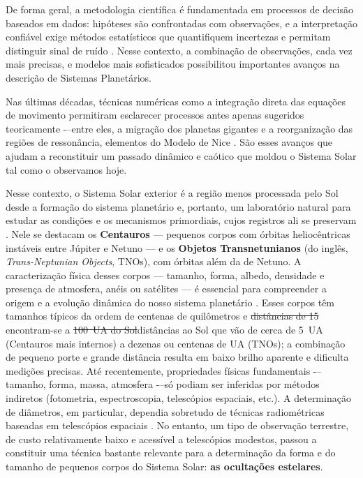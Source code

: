\documentclass[msc]{on} %
\makeatletter
\providecommand{\DIFaddtex}[1]{{\protect\color{red}#1}} %
\providecommand{\DIFdeltex}[1]{{\protect\color{red}\sout{#1}}} %
\providecommand{\DIFaddbegin}{} %
\providecommand{\DIFaddend}{} %
\providecommand{\DIFdelbegin}{} %
\providecommand{\DIFdelend}{} %
\providecommand{\DIFadd}[1]{\texorpdfstring{\DIFaddtex{#1}}{#1}} %
\providecommand{\DIFdel}[1]{\texorpdfstring{\DIFdeltex{#1}}{}} %
\let\sout@orig\sout %
\renewcommand{\sout}[1]{\ifmmode\text{\sout@orig{\ensuremath{#1}}}\else\sout@orig{#1}\fi} %
\makeatother
\begin{document}
De forma geral, a metodologia científica é fundamentada em processos de decisão baseados em dados: hipóteses são confrontadas com observações, e a interpretação confiável exige métodos estatísticos que quantifiquem incertezas e permitam distinguir sinal de ruído \citep{Wall2003}. Nesse contexto, a combinação de observações, cada vez mais precisas, e modelos mais sofisticados possibilitou importantes avanços na descrição de Sistemas Planetários.

Nas últimas décadas, técnicas numéricas como a integração direta das equações de movimento permitiram esclarecer processos antes apenas sugeridos teoricamente -\DIFaddbegin \DIFadd{--}\DIFaddend  entre eles, a migração dos planetas gigantes e a reorganização das regiões de ressonância, elementos do Modelo de Nice \citep{Tsiganis2009}. São esses avanços que ajudam a reconstituir um passado dinâmico e caótico que moldou o Sistema Solar tal como o observamos hoje. 

Nesse contexto, o Sistema Solar exterior é a região menos processada pelo Sol desde a formação do sistema planetário e, portanto, um laboratório natural para estudar as condições e os mecanismos primordiais, cujos registros ali se preservam \citep{Morbidelli2024, Tsiganis2009}. Nele se destacam os \textbf{Centauros} --- pequenos corpos com órbitas heliocêntricas instáveis entre Júpiter e Netuno --- e os \textbf{Objetos Transnetunianos} (do inglês, \textit{Trans-Neptunian Objects}, TNOs), com órbitas além da de Netuno. A caracterização física desses corpos --- tamanho, forma, albedo, densidade e presença de atmosfera, anéis ou satélites --- é essencial para compreender a origem e a evolução dinâmica do nosso sistema planetário \citep{Ortiz2020}. Esses corpos têm tamanhos típicos da ordem de centenas de quilômetros e \DIFdelbegin \DIFdel{distâncias de 15 }\DIFdelend\ifhmode\hskip0pt\fi \DIFaddbegin \DIFadd{encontram-se }\DIFaddend a \DIFdelbegin \DIFdel{100~UA do Sol}\DIFdelend\ifhmode\hskip0pt\fi \DIFaddbegin \DIFadd{distâncias ao Sol que vão de cerca de 5~UA (Centauros mais internos) a dezenas ou centenas de UA (TNOs)}\DIFaddend ; a combinação de pequeno porte e grande distância resulta em baixo brilho aparente e dificulta medições precisas. Até recentemente, propriedades físicas fundamentais -\DIFaddbegin \DIFadd{--}\DIFaddend  tamanho, forma, massa, atmosfera -\DIFaddbegin \DIFadd{--}\DIFaddend  só podiam ser inferidas por métodos indiretos (fotometria, espectroscopia, telescópios espaciais, etc.). A determinação de diâmetros, em particular, dependia sobretudo de técnicas radiométricas baseadas em telescópios espaciais
\citep{Fornasier2013}. No entanto, um tipo de observação terrestre, de custo relativamente baixo e acessível a telescópios modestos, passou a constituir uma técnica bastante relevante para a determinação da forma e do tamanho de pequenos corpos do Sistema Solar: \textbf{as ocultações estelares}.
\end{document}
